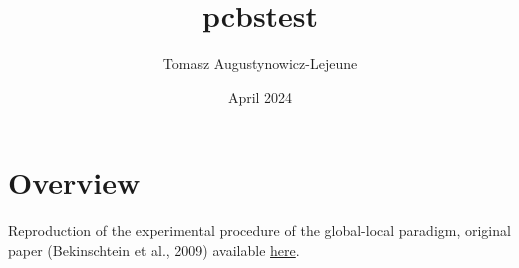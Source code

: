 \documentclass{article}
\title{pcbstest}
\author{Tomasz Augustynowicz-Lejeune}
\date{April 2024}
\begin{document}
\maketitle

\section{Overview}

Reproduction of the experimental procedure of the global-local paradigm, original paper (Bekinschtein et al., 2009) available \href{doi.org/10.1073/pnas.0809667106}{here}.
\end{document}
